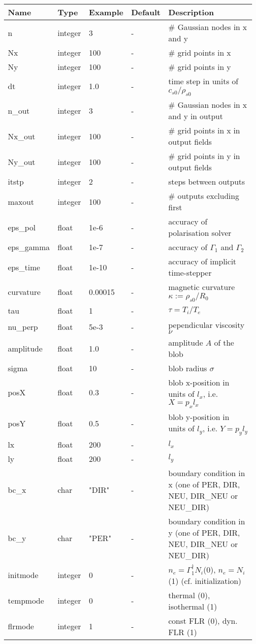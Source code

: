 \documentclass{hitec} %
\begin{document}
\begin{longtable}{llll>{\RaggedRight}p{7cm}}
\toprule
\rowcolor{gray!50}\textbf{Name} &  \textbf{Type} & \textbf{Example} & \textbf{Default} & \textbf{Description}  \\ \midrule
n      & integer & 3 & - &\# Gaussian nodes in x and y \\
Nx     & integer &100& - &\# grid points in x \\
Ny     & integer &100& - &\# grid points in y \\
dt     & integer &1.0& - &time step in units of $c_{s0}/\rho_{s0}$ \\
n\_out  & integer &3  & - &\# Gaussian nodes in x and y in output \\
Nx\_out & integer &100& - &\# grid points in x in output fields \\
Ny\_out & integer &100& - &\# grid points in y in output fields \\
itstp  & integer &2  & - &   steps between outputs \\
maxout & integer &100& - &      \# outputs excluding first \\
eps\_pol   & float &1e-6    & - &  accuracy of polarisation solver \\
eps\_gamma & float &1e-7    & - & accuracy of $\Gamma_1$ and $\Gamma_2$\\
eps\_time  & float &1e-10   & - & accuracy of implicit time-stepper \\
curvature  & float &0.00015& - & magnetic curvature $\kappa:=\rho_{s0}/R_0$ \\
tau        & float &1      & - & $\tau = T_i/T_e$  \\
nu\_perp    & float &5e-3   & - & pependicular viscosity $\nu$ \\
amplitude  & float &1.0    & - & amplitude $A$ of the blob \\
sigma      & float &10     & - & blob radius $\sigma$ \\
posX       & float &0.3    & - & blob x-position in units of $l_x$, i.e. $X = p_x l_x$\\
posY       & float &0.5    & - & blob y-position in units of $l_y$, i.e. $Y = p_y l_y$ \\
lx         & float &200    & - & $l_x$  \\
ly         & float &200    & - & $l_y$  \\
bc\_x   & char & "DIR"      & - & boundary condition in x (one of PER, DIR, NEU, DIR\_NEU or NEU\_DIR) \\
bc\_y   & char & "PER"      & - & boundary condition in y (one of PER, DIR, NEU, DIR\_NEU or NEU\_DIR) \\
initmode  & integer & 0 & - & \(n_e = \Gamma_1^\dagger N_i\)(0), \(n_e = N_i\) (1) (cf. initialization)\\
tempmode & integer & 0    & - &thermal (0), isothermal (1)\\
flrmode  & integer & 1    & - &const FLR (0), dyn. FLR (1)\\
\bottomrule
\end{longtable}
\end{document}
